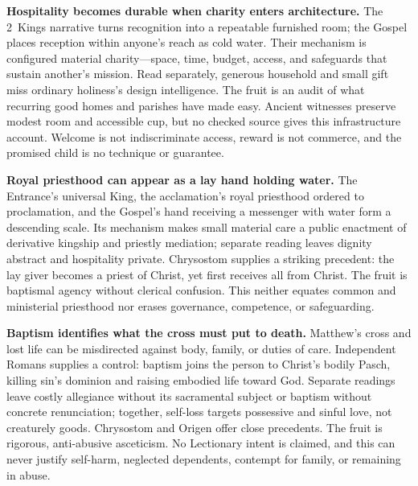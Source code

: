\begin{deepstudy}
\noindent\textbf{Hospitality becomes durable when charity enters architecture.\enspace{}}
The 2~Kings narrative turns recognition into a repeatable furnished room; the Gospel places reception within anyone's reach as cold water. Their mechanism is configured material charity---space, time, budget, access, and safeguards that sustain another's mission. Read separately, generous household and small gift miss ordinary holiness's design intelligence. The fruit is an audit of what recurring good homes and parishes have made easy. Ancient witnesses preserve modest room and accessible cup, but no checked source gives this infrastructure account. Welcome is not indiscriminate access, reward is not commerce, and the promised child is no technique or guarantee.

\noindent\textbf{Royal priesthood can appear as a lay hand holding water.\enspace{}}
The Entrance's universal King, the acclamation's royal priesthood ordered to proclamation, and the Gospel's hand receiving a messenger with water form a descending scale. Its mechanism makes small material care a public enactment of derivative kingship and priestly mediation; separate reading leaves dignity abstract and hospitality private. Chrysostom supplies a striking precedent: the lay giver becomes a priest of Christ, yet first receives all from Christ. The fruit is baptismal agency without clerical confusion. This neither equates common and ministerial priesthood nor erases governance, competence, or safeguarding.

\clearpage
\noindent\textbf{Baptism identifies what the cross must put to death.\enspace{}}
Matthew's cross and lost life can be misdirected against body, family, or duties of care. Independent Romans supplies a control: baptism joins the person to Christ's bodily Pasch, killing sin's dominion and raising embodied life toward God. Separate readings leave costly allegiance without its sacramental subject or baptism without concrete renunciation; together, self-loss targets possessive and sinful love, not creaturely goods. Chrysostom and Origen offer close precedents. The fruit is rigorous, anti-abusive asceticism. No Lectionary intent is claimed, and this can never justify self-harm, neglected dependents, contempt for family, or remaining in abuse.


\end{deepstudy}
